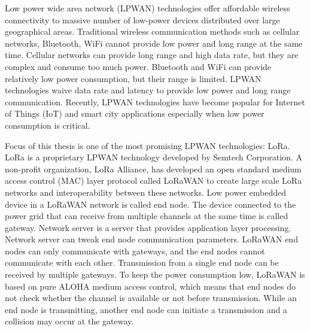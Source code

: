 Low power wide area network (LPWAN) technologies offer affordable wireless connectivity to massive number of low-power devices distributed over large geographical areas. Traditional wireless communication methods such as cellular networks, Bluetooth, WiFi cannot provide low power and long range at the same time. Cellular networks can provide long range and high data rate, but they are complex and consume too much power. Bluetooth and WiFi can provide relatively low power consumption, but their range is limited. LPWAN technologies waive data rate and latency to provide low power and long range communication. Recently, LPWAN technologies have become popular for Internet of Things (IoT) and smart city applications especially when low power consumption is critical.

Focus of this thesis is one of the most promising LPWAN technologies: LoRa. LoRa is a proprietary LPWAN technology developed by Semtech Corporation. A non-profit organization, LoRa Alliance, has developed an open standard medium access control (MAC) layer protocol called LoRaWAN to create large scale LoRa networks and interoperability between these networks. Low power embedded device in a LoRaWAN network is called end node. The device connected to the power grid that can receive from multiple channels at the same time is called gateway. Network server is a server that provides application layer processing. Network server can tweak end node communication parameters. LoRaWAN end nodes can only communicate with gateways, and the end nodes cannot communicate with each other. Transmission from a single end node can be received by multiple gateways. To keep the power consumption low, LoRaWAN is based on pure ALOHA medium access control, which means that end nodes do not check whether the channel is available or not before transmission. While an end node is transmitting, another end node can initiate a transmission and a collision may occur at the gateway.

